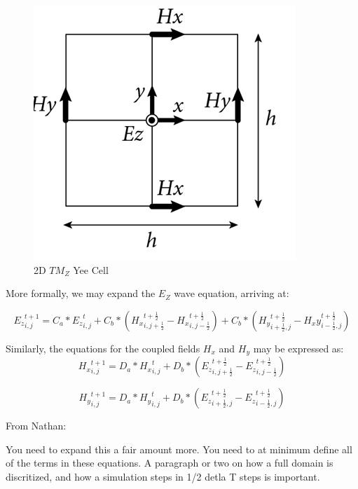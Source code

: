 \begin{figure}[H]
	\centering
	\includegraphics{yee-cell-ez.png}
	\caption{2D $TM_Z$ Yee Cell}
	\label{fig:yeecell}
\end{figure}

More formally, we may expand the $E_Z$ wave equation, arriving at:

\begin{equation} \label{eq:ezupdate}
{E_z}_{i,j}^{t+1} = C_a * {E_z}_{i,j}^{t} 
+ C_b * ({H_x}_{i,j+\frac{1}{2}}^{t+\frac{1}{2}} - {H_x}_{i,j-\frac{1}{2}}^{t+\frac{1}{2}})
+ C_b * ({H_y}_{i+\frac{1}{2},j}^{t+\frac{1}{2}} - {H_xy}_{i-\frac{1}{2},j}^{t+\frac{1}{2}})
\end{equation}

Similarly, the equations for the coupled fields $H_x$ and $H_y$ may be expressed as:
\begin{equation} \label{eq:hxupdate}
{H_x}_{i,j}^{t+1} = D_a * {H_x}_{i,j}^{t} + D_b * (
{E_z}_{i,j+\frac{1}{2}}^{t+\frac{1}{2}} 
-
{E_z}_{i,j-\frac{1}{2}}^{t+\frac{1}{2}}
)  
\end{equation}

\begin{equation} \label{eq:hyupdate}
{H_y}_{i,j}^{t+1} = D_a * {H_y}_{i,j}^{t} + D_b * (
{E_z}_{i+\frac{1}{2},j}^{t+\frac{1}{2}} 
-
{E_z}_{i-\frac{1}{2},j}^{t+\frac{1}{2}}
)  
\end{equation}

\iffalse
From Nathan:

You need to expand this a fair amount more.  You need to at minimum define all of the terms in these equations.  A paragraph or two on how a full domain is discritized, and how a simulation steps in 1/2 detla T steps is important.  


